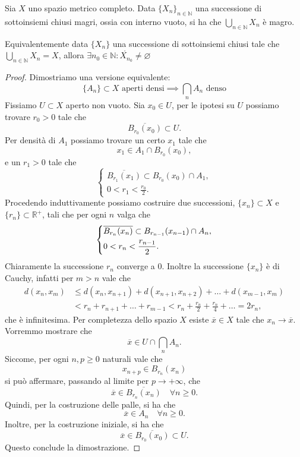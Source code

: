 \begin{lemmao}[Baire]
    Sia \(X\) uno spazio metrico completo. Data \(\{X_{n}\}_{n \in \mathbb{N}}\) una successione di sottoinsiemi chiusi magri, ossia con interno vuoto, si ha che \(
    \bigcup_{n \in \mathbb{N}} X_{n}\) è magro.

    Equivalentemente data \(\{X_{n}\} \) una successione di sottoinsiemi chiusi
    tale che \(\bigcup_{n \in \mathbb{N}} X_{n} = X\), allora \(\exists n_{0}
    \in \mathbb{N} : \mathring{X_{n_{0}}} \neq \varnothing\) 
\end{lemmao}
\begin{proof}
  Dimostriamo una versione equivalente: 
  \[
    \{A_n\} \subset X \text{ aperti densi} \implies \bigcap_{n} A_n \text{ denso}
  \]
  Fissiamo \(U \subset X\) aperto non vuoto. Sia \(x_0 \in U\), per le ipotesi su \(U\) possiamo trovare \(r_0 > 0\) tale che
  \[
    \overline {B_{r_0}(x_0)} \subset U.
  \]
  Per densità di \(A_1\) possiamo trovare un certo \(x_1\) tale che
  \[
    x_1 \in A_1 \cap B_{r_0}(x_0), 
  \]
  e un \(r_1 > 0\) tale che 
  \[
    \begin{cases}
      \overline{B_{r_1}(x_1)} \subset B_{r_0}(x_0) \cap A_1, \\
      0 < r_1 < \frac{r_0}{2}.
    \end{cases}
  \]
  Procedendo induttivamente possiamo costruire due successioni, \(\{x_n\} \subset X\) e \(\{r_n\} \subset \mathbb R^+\), tali che per ogni \(n\) valga che
  \[
    \begin{dcases}
      \overline{B_{r_n}(x_n)} \subset B_{r_{n-1}}(x_{n-1}) \cap A_n, \\
      0 < r_n < \frac{r_{n-1}}{2}.
    \end{dcases}
  \]
  Chiaramente la successione \(r_n\) converge a \(0\). Inoltre la successione \(\{x_n\}\) è di Cauchy, infatti per \(m > n\) vale che
  \[
  \begin{aligned}
      d(x_n, x_m) &\le d(x_n, x_{n+1}) + d(x_{n+1}, x_{n+2}) + \ldots + d(x_{m-1}, x_m) \\
      &< r_n + r_{n+1} + \ldots + r_{m-1} < r_n + \frac{r_n}{2} + \frac{r_n}{4} + \ldots = 2 r_n,
  \end{aligned}
  \]
  che è infinitesima. Per completezza dello spazio \(X\) esiste \(\overline x \in X\) tale che \(x_n \to \overline x\). Vorremmo mostrare che 
  \[
    \overline x \in U \cap \bigcap_{n} A_n.
  \]
  Siccome, per ogni \(n, p \geq 0\) naturali vale che 
  \[
    x_{n + p} \in B_{r_n}(x_n) 
  \]
  si può affermare, passando al limite per \(p \to +\infty\), che
  \[
    \overline x \in \overline{B_{r_n}(x_n)} \quad \forall n \geq 0.
  \]
  Quindi, per la costruzione delle palle, si ha che
  \[
    \overline x \in A_n \quad \forall n \geq 0.
  \]
  Inoltre, per la costruzione iniziale, si ha che
  \[
    \overline x \in \overline{B_{r_0}(x_0)} \subset U.
  \]  
  Questo conclude la dimostrazione. 
\end{proof}

